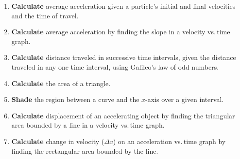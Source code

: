\documentclass[dvipsnames]{article}
\begin{document}
\begin{enumerate}[itemsep=0pt,topsep=-3pt]
\item \textbf{Calculate} average acceleration given a particle's initial and final velocities and the time of travel.
\item \textbf{Calculate} average acceleration by finding the slope in a velocity vs.\,time graph.
\item \textbf{Calculate} distance traveled in successive time intervals, given the distance traveled in any one time interval, using Galileo's law of odd numbers.
\item \textbf{Calculate} the area of a triangle.
\item \textbf{Shade} the region between a curve and the $x$-axis over a given interval.
\item \textbf{Calculate} displacement of an accelerating object by finding the triangular area bounded by a line in a velocity vs.\,time graph.
\item \textbf{Calculate} change in velocity ($\Delta v$) on an acceleration vs.\,time graph by finding the rectangular area bounded by the line.





\end{enumerate}
\end{document}

